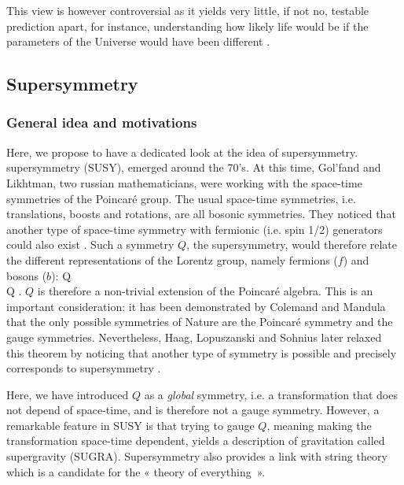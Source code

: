         This view is however controversial as it yields very little, if not no, testable
        prediction apart, for instance, understanding how likely life would be if the parameters of
        the Universe would have been different \cite{StarsInOtherUniverses}.

        \subsection{Supersymmetry \label{sec:SUSY}}

        \subsubsection{General idea and motivations}

        Here, we propose to have a dedicated look at the idea of supersymmetry. supersymmetry
        (SUSY), emerged around the 70's. At this time, Gol'fand and Likhtman, two
        russian mathematicians, were working with the space-time symmetries of the Poincaré
        group. The usual space-time symmetries, i.e. translations, boosts and rotations,
        are all bosonic symmetries. They noticed that another type of space-time symmetry
        with fermionic (i.e. spin 1/2) generators could also exist \cite{FirstSUSYPaper}.
        Such a symmetry $Q$,
        the supersymmetry, would therefore relate the different representations of the
        Lorentz group, namely fermions ($f$) and bosons ($b$):
        {
            Q \rvert {} \rangle \rightarrow \rvert {} \rangle \nonumber
            \\
            Q \rvert {} \rangle \rightarrow \rvert {} \rangle.
        }
        $Q$ is therefore a non-trivial extension of the
        Poincaré algebra. This is an important consideration: it has been demonstrated by
        Colemand and Mandula \cite{ColemandMandula} that the only possible symmetries of Nature are the
        Poincaré symmetry and the gauge symmetries. Nevertheless, Haag, Lopuszanski and
        Sohnius later relaxed this theorem \cite{HaagLopuszanskiSohnius} by noticing that another type of symmetry is
        possible and precisely corresponds to supersymmetry \cite{SUSYPrimer, Dawson}.

        Here, we have introduced $Q$ as a \emph{global} symmetry, i.e. a transformation
        that does not depend of space-time, and is therefore not a gauge symmetry.
        However, a remarkable feature in SUSY is that trying to gauge $Q$, meaning making
        the transformation space-time dependent, yields a description of gravitation called
        supergravity (SUGRA). Supersymmetry also provides a link with string theory which
        is a candidate for the « theory of everything\, ».

